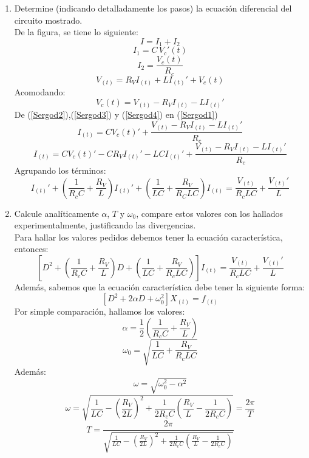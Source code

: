 \documentclass[a4paper,12pt]{report}
\begin{document}
\begin{enumerate}
\item Determine (indicando detalladamente los pasos) la ecuación diferencial del circuito mostrado.\\
De la figura, se tiene lo siguiente:
\begin{equation}
I = I_{1} + I_{2} \label{Sergod1}
\end{equation}
\begin{equation}
I_{1} = C\,V_{c}'(t) \label{Sergod2}
\end{equation}
\begin{equation}
I_{2} = \frac{V_{c}(t)}{R_{c}} \label{Sergod3}
\end{equation}
$$
V_{(t)} = R_{V}I_{(t)} + LI_{(t)}'+V_{c}(t)
$$
Acomodando:
\begin{equation}
V_{c}(t) = V_{(t)} - R_{V}I_{(t)} - LI_{(t)}' \label{Sergod4}
\end{equation}
De (\ref{Sergod2}),(\ref{Sergod3}) y (\ref{Sergod4}) en (\ref{Sergod1})
$$
I_{(t)} = CV_{c}(t)' + \frac{V_{(t)}-R_{V}I_{(t)}-LI_{(t)}'}{R_{c}}
$$
$$
I_{(t)} = CV_{c}(t)' - CR_{V}I_{(t)}' - LCI_{(t)}' + \frac{V_{(t)}-R_{V}I_{(t)}-LI_{(t)}'}{R_{c}}
$$
Agrupando los términos:
$$
I_{(t)}'+\left( \frac{1}{R_{c}C}+\frac{R_{V}}{L} \right)I_{(t)}' + \left( \frac{1}{LC} + \frac{R_{V}}{R_{C}LC} \right) I_{(t)} = \frac{V_{(t)}}{R_{c}LC} + \frac{V_{(t)}'}{L}
$$
\item Calcule analíticamente $\alpha$, $T$ y $\omega_{0}$, compare estos valores con los hallados experimentalmente, justificando las divergencias.\\
Para hallar los valores pedidos debemos tener la ecuación característica, entonces:
$$
\left[ D^{2} + \left( \frac{1}{R_{c}C} + \frac{R_{V}}{L} \right)D + \left( \frac{1}{LC} + \frac{R_{V}}{R_{c}LC} \right) \right]I_{(t)} = \frac{V_{(t)}}{R_{c}LC} + \frac{V_{(t)}'}{L}
$$
Además, sabemos que la ecuación característica debe tener la siguiente forma:
$$
\left[ D^{2} + 2\alpha D + \omega_{0}^{2} \right]X_{(t)} = f_{(t)}
$$
Por simple comparación, hallamos los valores:
$$
\alpha = \frac{1}{2} \left( \frac{1}{R_{c}C} + \frac{R_{V}}{L} \right)
$$
$$
\omega_{0} = \sqrt{\frac{1}{LC} + \frac{R_{V}}{R_{c}LC}}
$$
Además:
$$
\omega = \sqrt{\omega_{0}^{2} - \alpha^{2}}
$$
$$
\omega = \sqrt{\frac{1}{LC} - \left( \frac{R_{V}}{2L} \right)^{2} + \frac{1}{2R_{c}C}\left( \frac{R_{V}}{L} - \frac{1}{2R_{c}C} \right)} = \frac{2\pi}{T}
$$
$$
T = \frac{2\pi}{\sqrt{\frac{1}{LC} - \left( \frac{R_{V}}{2L} \right)^{2} + \frac{1}{2R_{c}C}\left( \frac{R_{V}}{L} - \frac{1}{2R_{c}C} \right)}}
$$
\end{enumerate}
\end{document}
